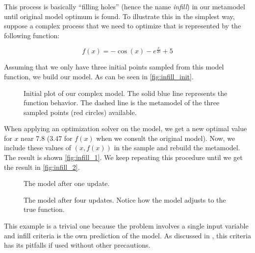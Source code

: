 \documentclass[../msc-thesis.tex]{subfiles}
\begin{document}
This process is basically ``filling holes'' (hence the name \textit{infill}) 
in our \kriging metamodel until original model optimum is found. To illustrate 
this in the simplest way, suppose a complex process that we need to optimize 
that is represented by the following function:

\begin{equation*}
    f(x) = -\cos(x) - e^{\frac{x}{20}} + 5
\end{equation*}

Assuming that we only have three initial points sampled from this model 
function, we build our \kriging model. As can be seen in 
\autoref{fig:infill_init}.

\begin{figure}[htb]
    \caption{\label{fig:infill_init}Initial plot of our complex model. The 
    solid blue line represents the function behavior. The dashed line is the 
    \kriging metamodel of the three sampled points (red circles) available.}
    \centering
    \def\svgwidth{\columnwidth}
    
\end{figure}

When applying an optimization solver on the \kriging model, we get a new 
optimal value for $x$ near 7.8 (3.47 for $f(x)$ when we consult the original 
model). Now, we include these values of $(x, f(x))$ in the sample and rebuild 
the \kriging metamodel. The result is shown \autoref{fig:infill_1}. We keep 
repeating this procedure until we get the result in \autoref{fig:infill_2}.

\begin{figure}[htb]
    \caption{\label{fig:infill_1}The \kriging model after one update.}
    \centering
    \def\svgwidth{\columnwidth}
    
\end{figure}

\begin{figure}[htb]
    \caption{\label{fig:infill_2}The \kriging model after four updates. 
    Notice how the \kriging model adjusts to the true function.}
    \centering
    \def\svgwidth{\columnwidth}
    
\end{figure}

This example is a trivial one because the problem involves a single input 
variable and infill criteria is the own \kriging prediction of the model. As 
discussed in \textcite{Jones2001}, this criteria has its pitfalls if used 
without other precautions.
\end{document}
